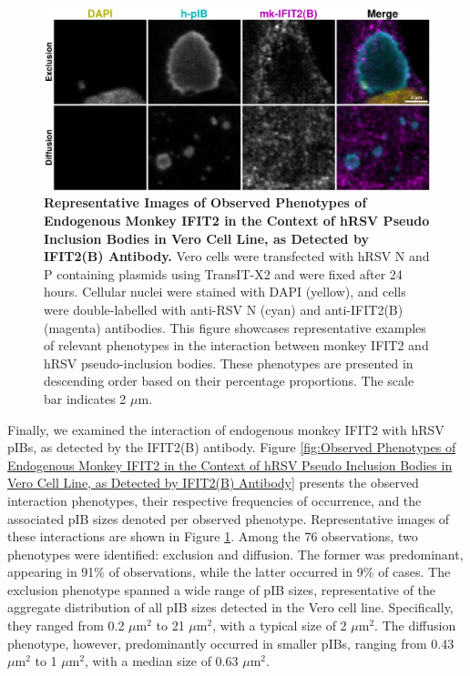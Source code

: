 \begin{figure}
    \centering
    \includegraphics[width=1\linewidth]{09. Chapter 4/Figs/01. pIB/03. IFIT2/03. IFIT2B/06. i2b-vero-hnhp.pdf} 
    \caption[Representative Images of Observed Phenotypes of Endogenous Monkey IFIT2 in the Context of hRSV Pseudo Inclusion Bodies in Vero Cell Line, as Detected by IFIT2(B) Antibody.]{\textbf{Representative Images of Observed Phenotypes of Endogenous Monkey IFIT2 in the Context of hRSV Pseudo Inclusion Bodies in Vero Cell Line, as Detected by IFIT2(B) Antibody.} Vero cells were transfected with hRSV N and P containing plasmids using TransIT-X2 and were fixed after 24 hours. Cellular nuclei were stained with DAPI (yellow), and cells were double-labelled with anti-RSV N (cyan) and anti-IFIT2(B) (magenta) antibodies. This figure showcases representative examples of relevant phenotypes in the interaction between monkey IFIT2 and hRSV pseudo-inclusion bodies. These phenotypes are presented in descending order based on their percentage proportions. The scale bar indicates 2 \(\mu \mbox{m}\).}
    \label{fig:Representative Images of Observed Phenotypes of Endogenous Monkey IFIT2 in the Context of hRSV Pseudo Inclusion Bodies in Vero Cell Line, as Detected by IFIT2(B) Antibody}
\end{figure}

Finally, we examined the interaction of endogenous monkey IFIT2 with hRSV pIBs, as detected by the IFIT2(B) antibody. Figure \ref{fig:Observed Phenotypes of Endogenous Monkey IFIT2 in the Context of hRSV Pseudo Inclusion Bodies in Vero Cell Line, as Detected by IFIT2(B) Antibody} presents the observed interaction phenotypes, their respective frequencies of occurrence, and the associated pIB sizes denoted per observed phenotype. Representative images of these interactions are shown in Figure \ref{fig:Representative Images of Observed Phenotypes of Endogenous Monkey IFIT2 in the Context of hRSV Pseudo Inclusion Bodies in Vero Cell Line, as Detected by IFIT2(B) Antibody}. Among the 76 observations, two phenotypes were identified: exclusion and diffusion. The former was predominant, appearing in 91\% of observations, while the latter occurred in 9\% of cases. The exclusion phenotype spanned a wide range of pIB sizes, representative of the aggregate distribution of all pIB sizes detected in the Vero cell line. Specifically, they ranged from 0.2 \(\mu \mbox{m}^2\) to 21 \(\mu \mbox{m}^2\), with a typical size of 2 \(\mu \mbox{m}^2\). The diffusion phenotype, however, predominantly occurred in smaller pIBs, ranging from 0.43 \(\mu \mbox{m}^2\) to 1 \(\mu \mbox{m}^2\), with a median size of 0.63 \(\mu \mbox{m}^2\).

